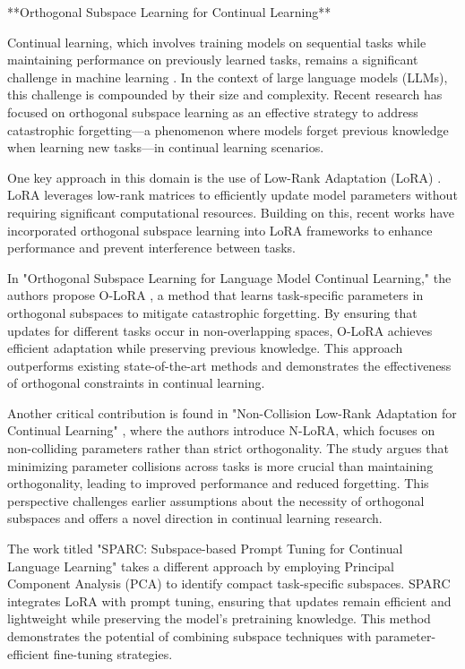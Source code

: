 \documentclass[conference]{IEEEtran}
\begin{document}
**Orthogonal Subspace Learning for Continual Learning**

Continual learning, which involves training models on sequential tasks while maintaining performance on previously learned tasks, remains a significant challenge in machine learning \cite{bX}. In the context of large language models (LLMs), this challenge is compounded by their size and complexity. Recent research has focused on orthogonal subspace learning as an effective strategy to address catastrophic forgetting—a phenomenon where models forget previous knowledge when learning new tasks—in continual learning scenarios.

One key approach in this domain is the use of Low-Rank Adaptation (LoRA) \cite{bX}. LoRA leverages low-rank matrices to efficiently update model parameters without requiring significant computational resources. Building on this, recent works have incorporated orthogonal subspace learning into LoRA frameworks to enhance performance and prevent interference between tasks.

In "Orthogonal Subspace Learning for Language Model Continual Learning," the authors propose O-LoRA \cite{bX}, a method that learns task-specific parameters in orthogonal subspaces to mitigate catastrophic forgetting. By ensuring that updates for different tasks occur in non-overlapping spaces, O-LoRA achieves efficient adaptation while preserving previous knowledge. This approach outperforms existing state-of-the-art methods and demonstrates the effectiveness of orthogonal constraints in continual learning.

Another critical contribution is found in "Non-Collision Low-Rank Adaptation for Continual Learning" \cite{bX}, where the authors introduce N-LoRA, which focuses on non-colliding parameters rather than strict orthogonality. The study argues that minimizing parameter collisions across tasks is more crucial than maintaining orthogonality, leading to improved performance and reduced forgetting. This perspective challenges earlier assumptions about the necessity of orthogonal subspaces and offers a novel direction in continual learning research.

The work titled "SPARC: Subspace-based Prompt Tuning for Continual Language Learning" \cite{bX} takes a different approach by employing Principal Component Analysis (PCA) to identify compact task-specific subspaces. SPARC integrates LoRA with prompt tuning, ensuring that updates remain efficient and lightweight while preserving the model's pretraining knowledge. This method demonstrates the potential of combining subspace techniques with parameter-efficient fine-tuning strategies.
\end{document}
